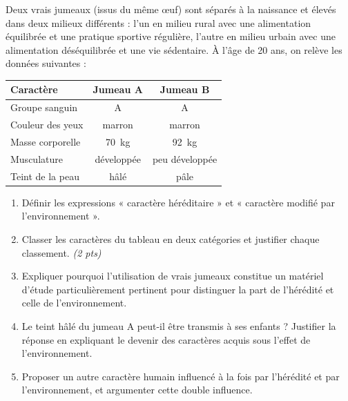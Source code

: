 \documentclass[11pt]{article}
\begin{document}
\begin{exercice}
Deux vrais jumeaux (issus du même œuf) sont séparés à la naissance et élevés dans deux milieux différents : l'un en milieu rural avec une alimentation équilibrée et une pratique sportive régulière, l'autre en milieu urbain avec une alimentation déséquilibrée et une vie sédentaire. À l'âge de 20 ans, on relève les données suivantes :
\begin{center}
\begin{tabular}{|l|c|c|}
\hline
\textbf{Caractère} & \textbf{Jumeau A} & \textbf{Jumeau B} \\
\hline
Groupe sanguin & A & A \\
\hline
Couleur des yeux & marron & marron \\
\hline
Masse corporelle & \SI{70}{\kg} & \SI{92}{\kg} \\
\hline
Musculature & développée & peu développée \\
\hline
Teint de la peau & hâlé & pâle \\
\hline
\end{tabular}
\end{center}
\begin{enumerate}
\item Définir les expressions « caractère héréditaire » et « caractère modifié par l'environnement ».
\item Classer les caractères du tableau en deux catégories et justifier chaque classement. \textit{(2 pts)}
\item Expliquer pourquoi l'utilisation de vrais jumeaux constitue un matériel d'étude particulièrement pertinent pour distinguer la part de l'hérédité et celle de l'environnement.
\item Le teint hâlé du jumeau A peut-il être transmis à ses enfants ? Justifier la réponse en expliquant le devenir des caractères acquis sous l'effet de l'environnement.
\item Proposer un autre caractère humain influencé à la fois par l'hérédité et par l'environnement, et argumenter cette double influence.
\end{enumerate}
\end{exercice}
\end{document}
